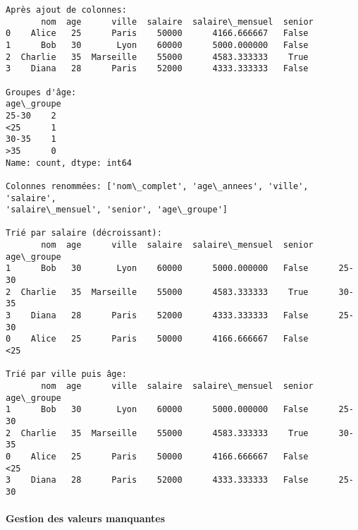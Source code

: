 \documentclass[11pt]{article}
\begin{document}
    \begin{Verbatim}[commandchars=\\\{\}]
Après ajout de colonnes:
       nom  age      ville  salaire  salaire\_mensuel  senior
0    Alice   25      Paris    50000      4166.666667   False
1      Bob   30       Lyon    60000      5000.000000   False
2  Charlie   35  Marseille    55000      4583.333333    True
3    Diana   28      Paris    52000      4333.333333   False

Groupes d'âge:
age\_groupe
25-30    2
<25      1
30-35    1
>35      0
Name: count, dtype: int64

Colonnes renommées: ['nom\_complet', 'age\_annees', 'ville', 'salaire',
'salaire\_mensuel', 'senior', 'age\_groupe']

Trié par salaire (décroissant):
       nom  age      ville  salaire  salaire\_mensuel  senior age\_groupe
1      Bob   30       Lyon    60000      5000.000000   False      25-30
2  Charlie   35  Marseille    55000      4583.333333    True      30-35
3    Diana   28      Paris    52000      4333.333333   False      25-30
0    Alice   25      Paris    50000      4166.666667   False        <25

Trié par ville puis âge:
       nom  age      ville  salaire  salaire\_mensuel  senior age\_groupe
1      Bob   30       Lyon    60000      5000.000000   False      25-30
2  Charlie   35  Marseille    55000      4583.333333    True      30-35
0    Alice   25      Paris    50000      4166.666667   False        <25
3    Diana   28      Paris    52000      4333.333333   False      25-30
    \end{Verbatim}

    \paragraph{Gestion des valeurs
manquantes}\label{gestion-des-valeurs-manquantes}
\end{document}
